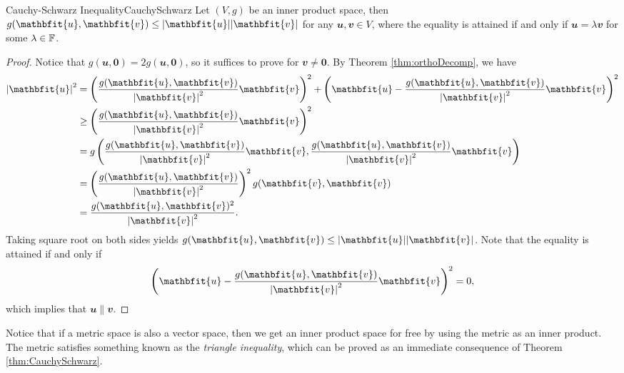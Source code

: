 \documentclass[math, code]{amznotes}
\theoremstyle{remark}
\newcommand{\zero}{\mathbf{0}}
\begin{document}
\begin{thmbox}{Cauchy-Schwarz Inequality}{CauchySchwarz}
    Let $(V, g)$ be an inner product space, then $g(\mathbfit{u}, \mathbfit{v}) \leq \abs{\mathbfit{u}}\abs{\mathbfit{v}}$ for any $\mathbfit{u}, \mathbfit{v} \in V$, where the equality is attained if and only if $\mathbfit{u} = \lambda\mathbfit{v}$ for some $\lambda \in \mathbb{F}$.
    \tcblower
    \begin{proof}
        Notice that $g(\mathbfit{u}, \zero) = 2g(\mathbfit{u}, \zero)$, so it suffices to prove for $\mathbfit{v} \neq \zero$. By Theorem \ref{thm:orthoDecomp}, we have 
        \begin{align*}
            \abs{\mathbfit{u}}^2 & = \left(\frac{g(\mathbfit{u}, \mathbfit{v})}{\abs{\mathbfit{v}}^2}\mathbfit{v}\right)^2 + \left(\mathbfit{u} - \frac{g(\mathbfit{u}, \mathbfit{v})}{\abs{\mathbfit{v}}^2}\mathbfit{v}\right)^2 \\
            & \geq \left(\frac{g(\mathbfit{u}, \mathbfit{v})}{\abs{\mathbfit{v}}^2}\mathbfit{v}\right)^2 \\
            & = g\left(\frac{g(\mathbfit{u}, \mathbfit{v})}{\abs{\mathbfit{v}}^2}\mathbfit{v}, \frac{g(\mathbfit{u}, \mathbfit{v})}{\abs{\mathbfit{v}}^2}\mathbfit{v}\right) \\
            & = \left(\frac{g(\mathbfit{u}, \mathbfit{v})}{\abs{\mathbfit{v}}^2}\right)^2g(\mathbfit{v}, \mathbfit{v}) \\
            & = \frac{g(\mathbfit{u}, \mathbfit{v})^2}{\abs{\mathbfit{v}}^2}.
        \end{align*}
        Taking square root on both sides yields $g(\mathbfit{u}, \mathbfit{v}) \leq \abs{\mathbfit{u}}\abs{\mathbfit{v}}$. Note that the equality is attained if and only if 
        \begin{equation*}
            \left(\mathbfit{u} - \frac{g(\mathbfit{u}, \mathbfit{v})}{\abs{\mathbfit{v}}^2}\mathbfit{v}\right)^2 = 0,
        \end{equation*}
        which implies that $\mathbfit{u} \parallel \mathbfit{v}$.
    \end{proof}
\end{thmbox}
Notice that if a metric space is also a vector space, then we get an inner product space for free by using the metric as an inner product. The metric satisfies something known as the \textit{triangle inequality}, which can be proved as an immediate consequence of Theorem \ref{thm:CauchySchwarz}.
\end{document}
